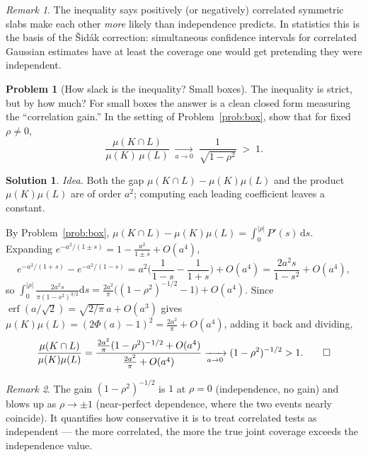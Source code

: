 \documentclass[14pt]{extarticle}
\theoremstyle{definition}
\newtheorem{exercise}{Problem}
\newtheorem*{solution}{Solution}
\theoremstyle{remark}
\newtheorem*{remark}{Remark}
\DeclareMathOperator\erf{erf}
\newcommand{\dd}{\mathrm{d}}
\begin{document}
\begin{remark}
The inequality says positively (or negatively) correlated symmetric slabs make each other \emph{more} likely than independence predicts. In statistics this is the basis of the \v{S}id\'ak correction: simultaneous confidence intervals for correlated Gaussian estimates have at least the coverage one would get pretending they were independent.
\end{remark}

\begin{exercise}[How slack is the inequality? Small boxes]\label{prob:smalla}
The inequality is strict, but by how much? For small boxes the answer is a clean closed form measuring the ``correlation gain.'' In the setting of Problem~\ref{prob:box}, show that for fixed $\rho\neq0$,
\[
\frac{\mu(K\cap L)}{\mu(K)\,\mu(L)}\;\xrightarrow[a\to0]{}\;\frac{1}{\sqrt{1-\rho^2}}\;>\;1.
\]
\end{exercise}
\begin{solution}
\emph{Idea.} Both the gap $\mu(K\cap L)-\mu(K)\mu(L)$ and the product $\mu(K)\mu(L)$ are of order $a^2$; computing each leading coefficient leaves a constant.

By Problem~\ref{prob:box}, $\mu(K\cap L)-\mu(K)\mu(L)=\int_0^{|\rho|}P'(s)\,\dd s$. Expanding $e^{-a^2/(1\pm s)}=1-\tfrac{a^2}{1\pm s}+O(a^4)$,
\[
e^{-a^2/(1+s)}-e^{-a^2/(1-s)}=a^2\Big(\frac1{1-s}-\frac1{1+s}\Big)+O(a^4)=\frac{2a^2 s}{1-s^2}+O(a^4),
\]
so $\int_0^{|\rho|}\tfrac{2a^2 s}{\pi(1-s^2)^{3/2}}\dd s=\tfrac{2a^2}{\pi}\bigl((1-\rho^2)^{-1/2}-1\bigr)+O(a^4)$. Since $\erf(a/\sqrt2)=\sqrt{2/\pi}\,a+O(a^3)$ gives $\mu(K)\mu(L)=(2\Phi(a)-1)^2=\tfrac{2a^2}{\pi}+O(a^4)$, adding it back and dividing,
\[
\frac{\mu(K\cap L)}{\mu(K)\mu(L)}=\frac{\tfrac{2a^2}{\pi}(1-\rho^2)^{-1/2}+O(a^4)}{\tfrac{2a^2}{\pi}+O(a^4)}\xrightarrow[a\to0]{}(1-\rho^2)^{-1/2}>1.\qedhere
\]
\end{solution}
\begin{remark}
The gain $(1-\rho^2)^{-1/2}$ is $1$ at $\rho=0$ (independence, no gain) and blows up as $\rho\to\pm1$ (near-perfect dependence, where the two events nearly coincide). It quantifies how conservative it is to treat correlated tests as independent --- the more correlated, the more the true joint coverage exceeds the independence value.
\end{remark}
\end{document}
